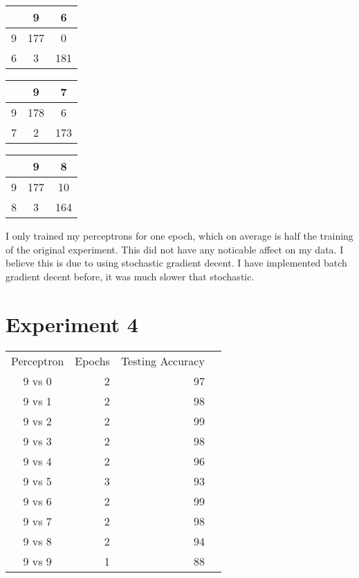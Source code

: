 \documentclass[12pt]{article}
\begin{document}
\begin{multicols}{3}
			\begin{tabular}{| c | c | c |}
				\hline
				& 9 & 6 \\ 
				\hline
				9 & 177 & 0 \\ 
				\hline
				6 & 3 & 181 \\ 
				\hline
			\end{tabular}
			\newline


			\begin{tabular}{| c | c | c |}
				\hline
				& 9 & 7 \\ 
				\hline
				9 & 178 & 6 \\ 
				\hline
				7 & 2 & 173 \\ 
				\hline
			\end{tabular}
			\newline


			\begin{tabular}{| c | c | c |}
				\hline
				& 9 & 8 \\ 
				\hline
				9 & 177 & 10 \\ 
				\hline
				8 & 3 & 164 \\ 
				\hline
			\end{tabular}
			\newline
        \end{multicols}

        I only trained my perceptrons for one epoch, which on average is half the training of the original experiment.  This did not have any noticable
        affect on my data.  I believe this is due to using stochastic gradient decent.  I have implemented batch gradient decent before, it was much slower
        that stochastic.
    \pagebreak
    \section*{Experiment 4}
		\begin{tabular}{ | c || r | r | r |}
			\hline
			 Perceptron & Epochs & Testing Accuracy \\ 
			 9 vs 0 & 2 & 97 \\ 
			\hline
			 9 vs 1 & 2 & 98 \\ 
			\hline
			 9 vs 2 & 2 & 99 \\ 
			\hline
			 9 vs 3 & 2 & 98 \\ 
			\hline
			 9 vs 4 & 2 & 96 \\ 
			\hline
			 9 vs 5 & 3 & 93 \\ 
			\hline
			 9 vs 6 & 2 & 99 \\ 
			\hline
			 9 vs 7 & 2 & 98 \\ 
			\hline
			 9 vs 8 & 2 & 94 \\ 
			\hline
			 9 vs 9 & 1 & 88 \\ 
			\hline
		\end{tabular}
\end{document}
